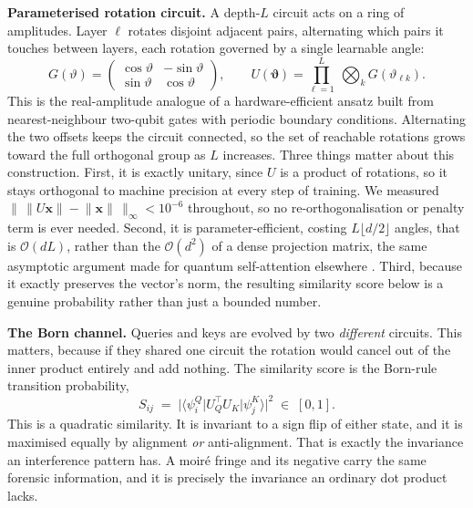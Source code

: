 \documentclass[conference]{IEEEtran}
\newcommand{\bs}[1]{\boldsymbol{#1}}
\newcommand{\ket}[1]{\lvert #1 \rangle}
\newcommand{\bra}[1]{\langle #1 \rvert}
\begin{document}
\textbf{Parameterised rotation circuit.} A depth-$L$ circuit acts on a ring of
amplitudes. Layer $\ell$ rotates disjoint adjacent pairs, alternating which pairs it
touches between layers, each rotation governed by a single learnable angle:
\begin{equation}
G(\vartheta)=\begin{pmatrix}\cos\vartheta & -\sin\vartheta\\
\sin\vartheta & \cos\vartheta\end{pmatrix},
\qquad
U(\bs{\vartheta})=\prod_{\ell=1}^{L}\ \bigotimes_{k} G(\vartheta_{\ell k}).
\label{eq:givens}
\end{equation}
This is the real-amplitude analogue of a hardware-efficient ansatz built from
nearest-neighbour two-qubit gates with periodic boundary conditions. Alternating the
two offsets keeps the circuit connected, so the set of reachable rotations grows
toward the full orthogonal group as $L$ increases. Three things matter about this
construction. First, it is exactly unitary, since $U$ is a product of rotations, so
it stays orthogonal to machine precision at every step of training. We measured
$\lVert\,\lVert U\bs{x}\rVert - \lVert\bs{x}\rVert\,\rVert_{\infty} < 10^{-6}$
throughout, so no re-orthogonalisation or penalty term is ever needed. Second, it is
parameter-efficient, costing $L\lfloor d/2\rfloor$ angles, that is
$\mathcal{O}(dL)$, rather than the $\mathcal{O}(d^{2})$ of a dense projection
matrix, the same asymptotic argument made for quantum self-attention elsewhere
\cite{cherrat2024qvt,evans2025on}. Third, because it exactly preserves the vector's
norm, the resulting similarity score below is a genuine probability rather than just
a bounded number.

\textbf{The Born channel.} Queries and keys are evolved by two \emph{different}
circuits. This matters, because if they shared one circuit the rotation would cancel
out of the inner product entirely and add nothing. The similarity score is the
Born-rule transition probability,
\begin{equation}
S_{ij} \;=\; \bigl\lvert \bra{\psi^{Q}_{i}} U_{Q}^{\!\top} U_{K} \ket{\psi^{K}_{j}} \bigr\rvert^{2}
\;\in\;[0,1].
\label{eq:born}
\end{equation}
This is a quadratic similarity. It is invariant to a sign flip of either state, and
it is maximised equally by alignment \emph{or} anti-alignment. That is exactly the
invariance an interference pattern has. A moir\'e fringe and its negative carry the
same forensic information, and it is precisely the invariance an ordinary dot
product lacks.
\end{document}
